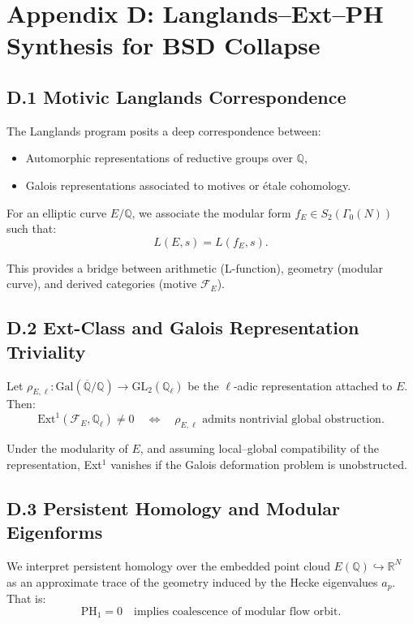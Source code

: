 \section*{Appendix D: Langlands--Ext--PH Synthesis for BSD Collapse}

\subsection*{D.1 Motivic Langlands Correspondence}

The Langlands program posits a deep correspondence between:
\begin{itemize}
  \item Automorphic representations of reductive groups over \( \mathbb{Q} \),
  \item Galois representations associated to motives or étale cohomology.
\end{itemize}

For an elliptic curve \( E/\mathbb{Q} \), we associate the modular form \( f_E \in S_2(\Gamma_0(N)) \) such that:
\[
L(E, s) = L(f_E, s).
\]

This provides a bridge between arithmetic (L-function), geometry (modular curve), and derived categories (motive \( \mathcal{F}_E \)).

\subsection*{D.2 Ext-Class and Galois Representation Triviality}

Let \( \rho_{E, \ell} : \mathrm{Gal}(\overline{\mathbb{Q}}/\mathbb{Q}) \to \mathrm{GL}_2(\mathbb{Q}_\ell) \) be the \(\ell\)-adic representation attached to \( E \).  
Then:
\[
\mathrm{Ext}^1(\mathcal{F}_E, \mathbb{Q}_\ell) \neq 0
\quad \Leftrightarrow \quad
\rho_{E,\ell} \text{ admits nontrivial global obstruction}.
\]

Under the modularity of \( E \), and assuming local–global compatibility of the representation, Ext$^1$ vanishes if the Galois deformation problem is unobstructed.

\subsection*{D.3 Persistent Homology and Modular Eigenforms}

We interpret persistent homology over the embedded point cloud \( E(\mathbb{Q}) \hookrightarrow \mathbb{R}^N \) as an approximate trace of the geometry induced by the Hecke eigenvalues \( a_p \).  
That is:
\[
\mathrm{PH}_1 = 0 \quad \text{implies coalescence of modular flow orbit}.
\]

